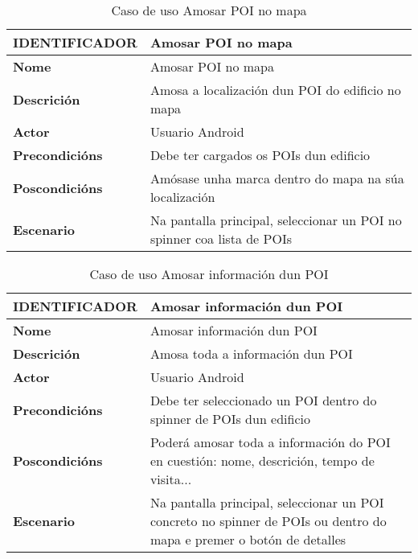 \begin{table}[tbp]
	\begin{tabular}{|l|p{10cm}|}
		\hline 
		\textbf{IDENTIFICADOR}	& \textbf{Amosar POI no mapa} \\ 
		\hline 
		\textbf{Nome} & Amosar POI no mapa \\ 
		\hline 
		\textbf{Descrición} & Amosa a localización dun POI do edificio no mapa \\ 
		\hline 
		\textbf{Actor} & Usuario Android \\ 
		\hline 
		\textbf{Precondicións} & Debe ter cargados os POIs dun edificio \\ 
		\hline 
		\textbf{Poscondicións} & Amósase unha marca dentro do mapa na súa localización \\ 
		\hline 
		\textbf{Escenario} & Na pantalla principal, seleccionar un POI no spinner coa lista de POIs \\ 
		\hline 
	\end{tabular}
	\caption{Caso de uso Amosar POI no mapa}
	\label{tab:cuAmosarPOIMapa}
\end{table}

\begin{table}[tbp]
	\begin{tabular}{|l|p{10cm}|}
		\hline 
		\textbf{IDENTIFICADOR}	& \textbf{Amosar información dun POI} \\ 
		\hline 
		\textbf{Nome} & Amosar información dun POI \\ 
		\hline 
		\textbf{Descrición} & Amosa toda a información dun POI \\ 
		\hline 
		\textbf{Actor} & Usuario Android \\ 
		\hline 
		\textbf{Precondicións} & Debe ter seleccionado un POI dentro do spinner de POIs dun edificio \\ 
		\hline 
		\textbf{Poscondicións} & Poderá amosar toda a información do POI en cuestión: nome, descrición, tempo de visita... \\ 
		\hline 
		\textbf{Escenario} & Na pantalla principal, seleccionar un POI concreto no spinner de POIs ou dentro do mapa e premer o botón de detalles \\ 
		\hline 
	\end{tabular}
	\caption{Caso de uso Amosar información dun POI}
	\label{tab:cuAmosarPOI}
\end{table}

